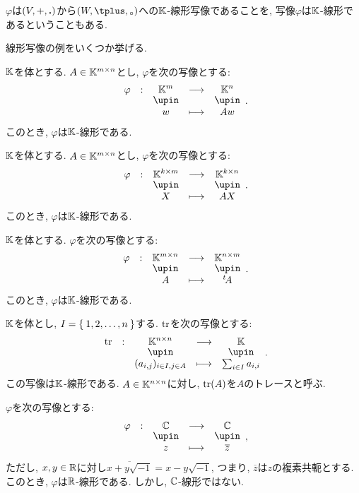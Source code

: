 \begin{definition}
  $\varphi$は$(V,+,\mathbin{\boldsymbol{.}})$から$(W,\pplus,\aact)$への$\mathbb{K}$-線形写像であることを,
  写像$\varphi$は$\mathbb{K}$-線形であるということもある.
\end{definition}

線形写像の例をいくつか挙げる.


\begin{example}
  $\mathbb{K}$を体とする.
  $A\in \mathbb{K}^{m\times n}$とし,
  $\varphi$を次の写像とする:
  \begin{align*}
    \shazo{\varphi}{\KK^m}{\KK^n}{w}{Aw}.
  \end{align*}
  このとき, $\varphi$は$\mathbb{K}$-線形である.
\end{example}

\begin{example}
  $\mathbb{K}$を体とする.
  $A\in \mathbb{K}^{m\times n}$とし,
  $\varphi$を次の写像とする:
  \begin{align*}
    \shazo{\varphi}{\KK^{k\times m}}{\KK^{k\times n}}{X}{AX}.
  \end{align*}
  このとき, $\varphi$は$\mathbb{K}$-線形である.
\end{example}

\begin{example}
  $\mathbb{K}$を体とする.
  $\varphi$を次の写像とする:
  \begin{align*}
    \shazo{\varphi}{\KK^{m\times n}}{\KK^{n\times m}}{A}{\transposed{A}}.
  \end{align*}
  このとき, $\varphi$は$\mathbb{K}$-線形である.
\end{example}

\begin{example}
  $\mathbb{K}$を体とし,
  $I=\Set{1,2,\ldots, n}$する.
  $\operatorname{tr}$を次の写像とする:
  \begin{align*}
    \shazo{\tr}{\KK^{n\times n}}{\KK}{(a_{i,j})_{i\in I, j\in A}}{\sum_{i\in I}a_{i,i}}.
  \end{align*}
  この写像は$\mathbb{K}$-線形である.
  $A\in \mathbb{K}^{n\times n}$に対し,
  $\operatorname{tr}(A)$を$A$のトレースと呼ぶ.
\end{example}


\begin{example}
  $\varphi$を次の写像とする:
  \begin{align*}
    \shazo{\varphi}{\CC}{\CC}{z}{\overline{z}},
  \end{align*}
  ただし, 
  $x,y\in\mathbb{R}$に対し$\overline{x+y\sqrt{-1}}=x-y\sqrt{-1}$, つまり,
  $\overline{z}$は$z$の複素共軛とする.
  このとき, $\varphi$は$\mathbb{R}$-線形である.
  しかし, $\mathbb{C}$-線形ではない.
\end{example}

